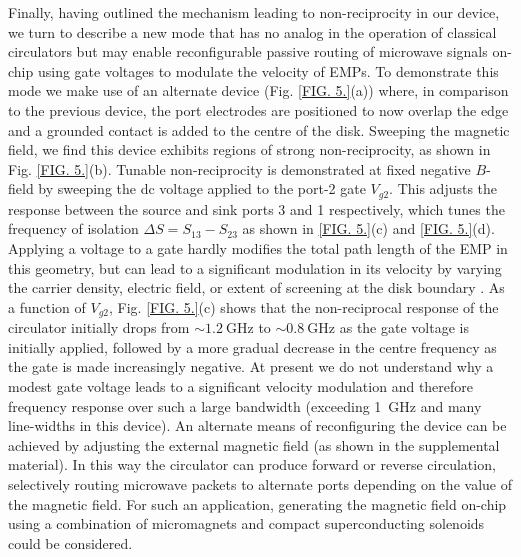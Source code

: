 Finally, having outlined the mechanism leading to non-reciprocity in our device, we turn to describe a new mode that has no analog in the operation of classical circulators but may enable reconfigurable passive routing of microwave signals on-chip using gate voltages to modulate the velocity of EMPs. To demonstrate this mode we make use of an alternate device (Fig. \ref{FIG. 5.}(a)) where, in comparison to the previous device, the port electrodes are positioned to now overlap the edge and a grounded contact is added to the centre of the disk. Sweeping the magnetic field, we find this device exhibits regions of strong non-reciprocity, as shown in Fig. \ref{FIG. 5.}(b). Tunable non-reciprocity is demonstrated at fixed negative $B$-field by sweeping the dc voltage applied to the port-2 gate $V_{g2}$.  This adjusts the response between the source and sink ports 3 and 1 respectively, which tunes the frequency of isolation $\Delta  S  = S_{13}-S_{23}$ as shown in \ref{FIG. 5.}(c) and \ref{FIG. 5.}(d). Applying a voltage to a gate hardly modifies the total path length of the EMP in this geometry, but can lead to a significant modulation in its velocity by varying the carrier density, electric field, or extent of screening at the disk boundary \cite{kamata2014fractionalized,kumada2013plasmon}. As a function of $V_{g2}$, Fig. \ref{FIG. 5.}(c) shows that the non-reciprocal response of the circulator initially drops from $\sim \SI{1.2}{\giga\hertz}$ to $\sim \SI{0.8}{\giga\hertz}$ as the gate voltage is initially applied, followed by a more gradual decrease in the centre frequency as the gate is made increasingly negative. At present we do not understand why a modest gate voltage leads to a significant velocity modulation and therefore frequency response over such a large bandwidth (exceeding \SI{1}{\giga\hertz} and many line-widths in this device). An alternate means of reconfiguring the device can be achieved by adjusting the external magnetic field (as shown in the supplemental material).  In this way the circulator can produce forward or reverse circulation, selectively routing microwave packets to alternate ports depending on the value of the magnetic field. For such an application, generating the magnetic field on-chip using a combination of micromagnets \cite{pioro2008electrically} and compact superconducting solenoids could be considered.

